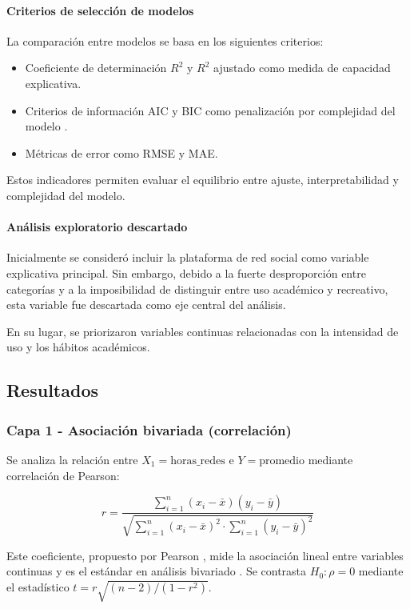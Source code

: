 \documentclass[12pt]{article}
\begin{document}
\paragraph{Criterios de selección de modelos}

La comparación entre modelos se basa en los siguientes criterios:

\begin{itemize}
\item Coeficiente de determinación \(R^2\) y \(R^2\) ajustado como medida de capacidad explicativa.
\item Criterios de información AIC y BIC como penalización por complejidad del modelo \cite{akaike1974, schwarz1978}.
\item Métricas de error como RMSE y MAE.
\end{itemize}

Estos indicadores permiten evaluar el equilibrio entre ajuste, interpretabilidad y complejidad del modelo.

\paragraph{Análisis exploratorio descartado}

Inicialmente se consideró incluir la plataforma de red social como variable explicativa principal. Sin embargo, debido a la fuerte desproporción entre categorías y a la imposibilidad de distinguir entre uso académico y recreativo, esta variable fue descartada como eje central del análisis.

En su lugar, se priorizaron variables continuas relacionadas con la intensidad de uso y los hábitos académicos.

\subsection*{Resultados}

\subsubsection*{Capa 1 - Asociación bivariada (correlación)}

Se analiza la relación entre \(X_1 = \text{horas\_redes}\) e \(Y = \text{promedio}\) mediante correlación de Pearson:

\[
r = \frac{\sum_{i=1}^{n}(x_i - \bar{x})(y_i - \bar{y})}{\sqrt{\sum_{i=1}^{n}(x_i - \bar{x})^2 \cdot \sum_{i=1}^{n}(y_i - \bar{y})^2}}
\]

Este coeficiente, propuesto por Pearson \cite{pearson1896}, mide la asociación lineal entre variables continuas y es el estándar en análisis bivariado \cite{montgomery2014}. Se contrasta \(H_0: \rho = 0\) mediante el estadístico \(t = r\sqrt{(n-2)/(1-r^2)}\).
\end{document}
